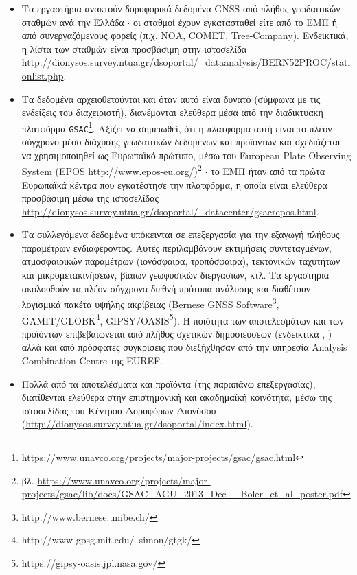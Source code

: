 \documentclass[11pt]{article}
\begin{document}
\begin{itemize}
\item Τα εργαστήρια ανακτούν δορυφορικά δεδομένα GNSS από πλήθος γεωδαιτικών σταθμών ανά την Ελλάδα $\cdot$ οι σταθμοί έχουν
εγκατασταθεί είτε από το ΕΜΠ ή από συνεργαζόμενους φορείς (π.χ. ΝΟΑ, COMET, Tree-Company). Ενδεικτικά, η λίστα των σταθμών είναι προσβάσιμη στην ιστοσελίδα \url{http://dionysos.survey.ntua.gr/dsoportal/_dataanalysis/BERN52PROC/stationlist.php}.

\item Τα δεδομένα αρχειοθετούνται και όταν αυτό είναι δυνατό (σύμφωνα με τις ενδείξεις του διαχειριστή), διανέμονται ελεύθερα μέσα από την διαδικτυακή πλατφόρμα \texttt{GSAC}\footnote{\url{https://www.unavco.org/projects/major-projects/gsac/gsac.html}}. Αξίζει να σημειωθεί, ότι η πλατφόρμα αυτή είναι το πλέον σύγχρονο μέσο διάχυσης γεωδαιτικών δεδομένων και προϊόντων και σχεδιάζεται να χρησιμοποιηθεί ως Ευρωπαϊκό πρώτυπο, μέσω του European Plate Observing System (EPOS \url{http://www.epos-eu.org/})\footnote{βλ. \url{https://www.unavco.org/projects/major-projects/gsac/lib/docs/GSAC_AGU_2013_Dec__Boler_et_al_poster.pdf}} $\cdot$ το ΕΜΠ ήταν από τα πρώτα Ευρωπαϊκά κέντρα που εγκατέστησε την πλατφόρμα, η οποία είναι ελεύθερα προσβάσιμη μέσω της ιστοσελίδας \url{http://dionysos.survey.ntua.gr/dsoportal/_datacenter/gsacrepos.html}.

\item Τα συλλεγόμενα δεδομένα υπόκεινται σε επεξεργασία για την εξαγωγή πλήθους παραμέτρων ενδιαφέροντος. Αυτές περιλαμβάνουν εκτιμήσεις συντεταγμένων, ατμοσφαιρικών παραμέτρων (ιονόσφαιρα, τροπόσφαιρα), τεκτονικών ταχυτήτων και μικρομετακινήσεων, βίαιων γεωφυσικών διεργασιων, κτλ. Τα εργαστήρια ακολουθούν τα πλέον σύγχρονα διεθνή πρότυπα ανάλυσης και διαθέτουν λογισμικά πακέτα υψήλης ακρίβειας (Bernese GNSS Software\footnote{http://www.bernese.unibe.ch/}, GAMIT/GLOBK\footnote{http://www-gpsg.mit.edu/~simon/gtgk/}, GIPSY/OASIS\footnote{https://gipsy-oasis.jpl.nasa.gov/}). Η ποιότητα των αποτελεσμάτων και των προϊόντων επιβεβαιώνεται από πλήθος σχετικών δημοσιεύσεων (ενδεικτικά \cite{anastacep}, \cite{GRL50066}) αλλά και από πρόσφατες συγκρίσεις που διεξήχθησαν από την υπηρεσία Analysis Combination Centre της EUREF.

\item Πολλά από τα αποτελέσματα και προϊόντα (της παραπάνω επεξεργασίας), διατίθενται ελεύθερα στην επιστημονική και ακαδημαϊκή κοινότητα, μέσω της ιστοσελίδας του Κέντρου Δορυφόρων Διονύσου (\url{http://dionysos.survey.ntua.gr/dsoportal/index.html}).
\end{itemize}
\end{document}
